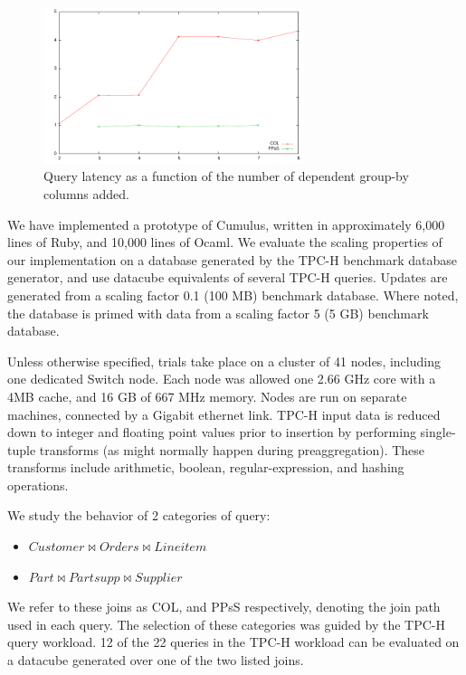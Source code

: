\begin{figure}
\begin{center}
\includegraphics[width=3.0in]{images/aggvslatency.pdf}
\caption{Query latency as a function of the number of dependent group-by columns added.}
\label{fig:aggvslatency}
\end{center}
\end{figure}

We have implemented a prototype of Cumulus, written in approximately 6,000 lines of Ruby, and 10,000 lines of Ocaml.  We evaluate the scaling properties of our implementation on a database generated by the TPC-H benchmark database generator, and use datacube equivalents of several TPC-H queries.  Updates are generated from a scaling factor 0.1 (100 MB) benchmark database.  Where noted, the database is primed with data from a scaling factor 5 (5 GB) benchmark database.

Unless otherwise specified, trials take place on a cluster of 41 nodes, including one dedicated Switch node.  Each node was allowed one 2.66 GHz core with a 4MB cache, and 16 GB of 667 MHz memory.  Nodes are run on separate machines, connected by a Gigabit ethernet link.  TPC-H input data is reduced down to integer and floating point values prior to insertion by performing single-tuple transforms (as might normally happen during preaggregation).  These transforms include arithmetic, boolean, regular-expression, and hashing operations.

We study the behavior of 2 categories of query: 
\begin{itemize}
\item $Customer \bowtie Orders \bowtie Lineitem$
\item $Part \bowtie Partsupp \bowtie Supplier$
\end{itemize}
We refer to these joins as COL, and PPsS respectively, denoting the join path used in each query.  The selection of these categories was guided by the TPC-H query workload.  12 of the 22 queries in the TPC-H workload can be evaluated on a datacube generated over one of the two listed joins.  

